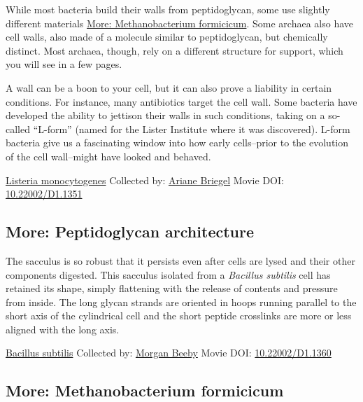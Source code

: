\documentclass[]{tufte-book}
\begin{document}
While most bacteria build their walls from peptidoglycan, some use slightly different materials \protect\hyperlink{Methanobacterium_formicicum}{More: Methanobacterium formicicum}. Some archaea also have cell walls, also made of a molecule similar to peptidoglycan, but chemically distinct. Most archaea, though, rely on a different structure for support, which you will see in a few pages.

A wall can be a boon to your cell, but it can also prove a liability in certain conditions. For instance, many antibiotics target the cell wall. Some bacteria have developed the ability to jettison their walls in such conditions, taking on a so-called ``L-form'' (named for the Lister Institute where it was discovered). L-form bacteria give us a fascinating window into how early cells--prior to the evolution of the cell wall--might have looked and behaved.



\hypertarget{htmlwidget-0f4c3ad120b9c3e06004}{}

\label{fig:2-2}\protect\hyperlink{tree}{Listeria monocytogenes} Collected by: \protect\hyperlink{ariane_briegel}{Ariane Briegel} Movie DOI: \href{https://doi.org/10.22002/D1.1351}{10.22002/D1.1351}

\hypertarget{Peptidoglycan_architecture}{%
\subsection*{More: Peptidoglycan architecture}\label{Peptidoglycan_architecture}}

The sacculus is so robust that it persists even after cells are lysed and their other components digested. This sacculus isolated from a \emph{Bacillus subtilis} cell has retained its shape, simply flattening with the release of contents and pressure from inside. The long glycan strands are oriented in hoops running parallel to the short axis of the cylindrical cell and the short peptide crosslinks are more or less aligned with the long axis.



\hypertarget{htmlwidget-44bbcae19eecbcd864c9}{}

\label{fig:2-2a}\protect\hyperlink{tree}{Bacillus subtilis} Collected by: \protect\hyperlink{morgan_beeby}{Morgan Beeby} Movie DOI: \href{https://doi.org/10.22002/D1.1360}{10.22002/D1.1360}

\hypertarget{Methanobacterium_formicicum}{%
\subsection*{More: Methanobacterium formicicum}\label{Methanobacterium_formicicum}}
\end{document}
